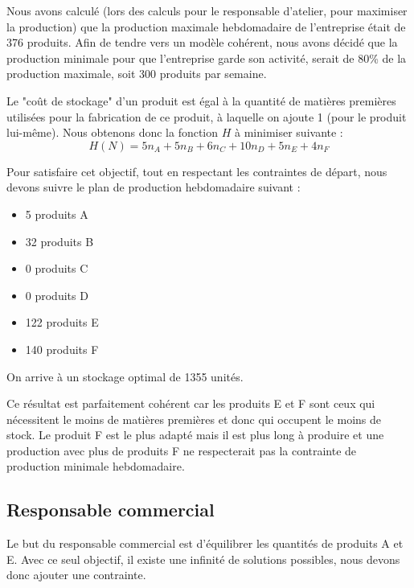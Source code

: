 \documentclass[a4paper,10pt]{article}
\begin{document}
Nous avons calculé (lors des calculs pour le responsable d'atelier, pour maximiser la production) que la production maximale hebdomadaire de l'entreprise était de 376 produits. Afin de tendre vers un modèle cohérent, nous avons décidé que la production minimale pour que l'entreprise garde son activité, serait de 80\% de la production maximale, soit 300 produits par semaine.\newline


Le "coût de stockage" d'un produit est égal à la quantité de matières premières utilisées pour la fabrication de ce produit, à laquelle on ajoute 1 (pour le produit lui-même). Nous obtenons donc la fonction $H$ à minimiser suivante :
$$ H(N)=  5n_A + 5n_B + 6n_C +10n_D + 5n_E + 4n_F $$

Pour satisfaire cet objectif, tout en respectant les contraintes de départ, nous devons suivre le plan de production hebdomadaire suivant :\newline
\begin{itemize}
\item[\textbullet] 5 produits A
\item[\textbullet] 32 produits B
\item[\textbullet] 0 produits C
\item[\textbullet] 0 produits D
\item[\textbullet] 122 produits E
\item[\textbullet] 140 produits F\newline
\end{itemize}

On arrive à un stockage optimal de 1355 unités.

Ce résultat est parfaitement cohérent car les produits E et F sont ceux qui nécessitent le moins de matières premières et donc qui occupent le moins de stock. Le produit F est le plus adapté mais il est plus long à produire et une production avec plus de produits F ne respecterait pas la contrainte de production minimale hebdomadaire.


\subsection{Responsable commercial}

Le but du responsable commercial est d'équilibrer les quantités de produits A et E. Avec ce seul objectif, il existe une infinité de solutions possibles, nous devons donc ajouter une contrainte.
\end{document}
